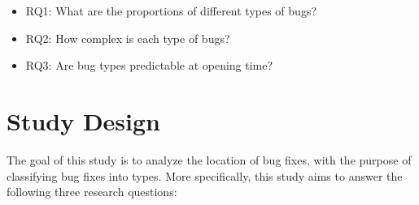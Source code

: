 \begin{itemize}
    \item RQ1: What are the proportions of different types of bugs?
    \item RQ2: How complex is each type of bugs?
    \item RQ3: Are bug types predictable at opening time?
\end{itemize}

\section{Study Design}\label{study-design}

The goal of this study is to analyze the location of bug fixes, with the
purpose of classifying bug fixes into types. More specifically, this
study aims to answer the following three research questions:


